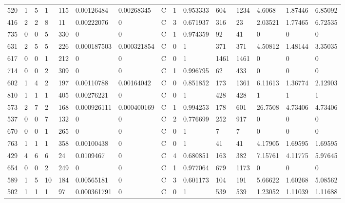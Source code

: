 \begin{latin}
\begin{longtable}{lllllllllllllll}
	520 & 1  & 5   & 1  & 115 & 0.00126484     & 0.00268345     & C & 1  & 0.953333 & 604  & 1234 & 4.6068  & 1.87446 & 6.85092 \\
	416 & 2  & 2   & 8  & 11  & 0.00222076     & 0              & C & 3  & 0.671937 & 316  & 23   & 2.03521 & 1.77465 & 6.72535 \\
	735 & 0  & 0   & 5  & 330 & 0              & 0              & C & 1  & 0.974359 & 92   & 41   & 0       & 0       & 0       \\
	631 & 2  & 5   & 5  & 226 & 0.000187503    & 0.000321854    & C & 0  & 1        & 371  & 371  & 4.50812 & 1.48144 & 3.35035 \\
	617 & 0  & 0   & 1  & 212 & 0              & 0              & C & 0  & 1        & 1461 & 1461 & 0       & 0       & 0       \\
	714 & 0  & 0   & 2  & 309 & 0              & 0              & C & 1  & 0.996795 & 62   & 433  & 0       & 0       & 0       \\
	602 & 1  & 4   & 2  & 197 & 0.00110788     & 0.00164042     & C & 0  & 0.851852 & 173  & 1361 & 6.11613 & 1.36774 & 2.12903 \\
	810 & 1  & 1   & 1  & 405 & 0.00276221     & 0              & C & 0  & 1        & 428  & 428  & 1       & 1       & 1       \\
	573 & 2  & 7   & 2  & 168 & 0.000926111    & 0.000400169    & C & 1  & 0.994253 & 178  & 601  & 26.7508 & 4.73406 & 4.73406 \\
	537 & 0  & 0   & 7  & 132 & 0              & 0              & C & 2  & 0.776699 & 252  & 917  & 0       & 0       & 0       \\
	670 & 0  & 0   & 1  & 265 & 0              & 0              & C & 0  & 1        & 7    & 7    & 0       & 0       & 0       \\
	763 & 1  & 1   & 1  & 358 & 0.00100438     & 0              & C & 0  & 1        & 41   & 41   & 4.17905 & 1.69595 & 1.69595 \\
	429 & 4  & 6   & 6  & 24  & 0.0109467      & 0              & C & 4  & 0.680851 & 163  & 382  & 7.15761 & 4.11775 & 5.97645 \\
	654 & 0  & 0   & 2  & 249 & 0              & 0              & C & 1  & 0.977064 & 679  & 1173 & 0       & 0       & 0       \\
	589 & 1  & 5   & 10 & 184 & 0.00565181     & 0              & C & 3  & 0.601173 & 104  & 191  & 5.66622 & 1.60268 & 5.08562 \\
	502 & 1  & 1   & 1  & 97  & 0.000361791    & 0              & C & 0  & 1        & 539  & 539  & 1.23052 & 1.11039 & 1.11688 \\

\end{longtable}
\end{latin}
